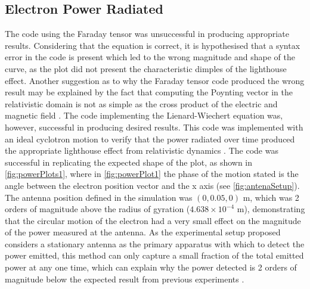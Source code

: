 \documentclass[a4paper,12pt, notitlepage]{article}
\begin{document}
\subsection{Electron Power Radiated}
The code using the Faraday tensor was unsuccessful in producing appropriate results. Considering that the equation is correct, it is hypothesised that a syntax error in the code is present which led to the wrong magnitude and shape of the curve, as the plot did not present the characteristic dimples of the lighthouse effect. Another suggestion as to why the Faraday tensor code produced the wrong result may be explained by the fact that computing the Poynting vector in the relativistic domain is not as simple as the cross product of the electric and magnetic field \cite{Paul2009,Lode2021}. The code implementing the Lienard-Wiechert equation was, however, successful in producing desired results. This code was implemented with an ideal cyclotron motion to verify that the power radiated over time produced the appropriate lighthouse effect from relativistic dynamics \cite{Jackson1999}. The code was successful in replicating the expected shape of the plot, as shown in \cref{fig:powerPlots1}, where in \cref{fig:powerPlot1} the phase of the motion stated is the angle between the electron position vector and the x axis (see \cref{fig:antenaSetup}). The antenna position defined in the simulation was $(0,0.05,0)$ m, which was 2 orders of magnitude above the radius of gyration ($4.638\times10^{-4}$ m), demonstrating that the circular motion of the electron had a very small effect on the magnitude of the power measured at the antenna. As the experimental setup proposed considers a stationary antenna as the primary apparatus with which to detect the power emitted, this method can only capture a small fraction of the total emitted power at any one time, which can explain why the power detected is 2 orders of magnitude below the expected result from previous experiments \cite{Ashtari2019}.
\end{document}
